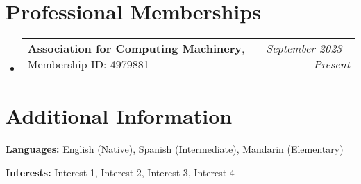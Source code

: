 \documentclass[a4paper,11pt]{article}
\makeatletter
\newcommand{\resumePOR}[3]{
\vspace{0.5mm}\item
    \begin{tabular*}{0.97\textwidth}[t]{l@{\extracolsep{\fill}}r}
        \textbf{#1}\hspace{0.3mm}#2 & \textit{\small{#3}} 
    \end{tabular*}
    \vspace{-2mm}
}
\newcommand{\resumeSubHeadingListStart}{\begin{itemize}[leftmargin=*,labelsep=1mm]}
\newcommand{\resumeSubHeadingListEnd}{\end{itemize}\vspace{2mm}}
\makeatother
\begin{document}
\vspace{-6mm}

\section{\textbf{Professional Memberships}}
\vspace{-0.4mm}
\resumeSubHeadingListStart
\resumePOR{Association for Computing Machinery}
    {, Membership ID: 4979881}
    {September 2023 - Present}

\resumeSubHeadingListEnd


\vspace{-6mm}

\section{\textbf{Additional Information}}
\vspace{-0.4mm}
\small{
\textbf{Languages:} English (Native), Spanish (Intermediate), Mandarin (Elementary)

\textbf{Interests:} Interest 1, Interest 2, Interest 3, Interest 4
}
\vspace{-4mm}
\end{document}
